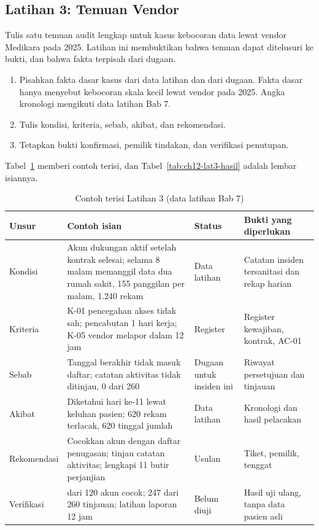 \subsection*{Latihan 3: Temuan Vendor}

Tulis satu temuan audit lengkap untuk kasus kebocoran data lewat vendor Medikara pada 2025. Latihan
ini membuktikan bahwa temuan dapat ditelusuri ke bukti, dan bahwa fakta terpisah dari dugaan.
\begin{enumerate}
  \item Pisahkan fakta dasar kasus dari data latihan dan dari dugaan. Fakta dasar hanya menyebut
  kebocoran skala kecil lewat vendor pada 2025. Angka kronologi mengikuti data latihan Bab 7.
  \item Tulis kondisi, kriteria, sebab, akibat, dan rekomendasi.
  \item Tetapkan bukti konfirmasi, pemilik tindakan, dan verifikasi penutupan.
\end{enumerate}

Tabel~\ref{tab:ch12-lat3-contoh} memberi contoh terisi, dan Tabel~\ref{tab:ch12-lat3-hasil} adalah
lembar isiannya.

\begin{table}[!htb]
  \centering\small
  \caption{Contoh terisi Latihan 3 (data latihan Bab 7)}\label{tab:ch12-lat3-contoh}
  \begin{tabularx}{\textwidth}{|>{\raggedright\arraybackslash}p{}|>{\raggedright\arraybackslash}X|>{\raggedright\arraybackslash}p{}|>{\raggedright\arraybackslash}p{}|}
    \hline
    \textbf{Unsur} & \textbf{Contoh isian} & \textbf{Status} & \textbf{Bukti yang diperlukan} \\
    \hline
    Kondisi & Akun dukungan aktif setelah kontrak selesai; selama 8 malam memanggil data dua rumah
    sakit, 155 panggilan per malam, 1.240 rekam & Data latihan & Catatan insiden tersanitasi dan
    rekap harian \\ \hline
    Kriteria & K-01 pencegahan akses tidak sah; pencabutan 1 hari kerja; K-05 vendor melapor dalam
    12 jam & Register & Register kewajiban, kontrak, AC-01 \\ \hline
    Sebab & Tanggal berakhir tidak masuk daftar; catatan aktivitas tidak ditinjau, 0 dari 260 &
    Dugaan untuk insiden ini & Riwayat persetujuan dan tinjauan \\ \hline
    Akibat & Diketahui hari ke-11 lewat keluhan pasien; 620 rekam terlacak, 620 tinggal jumlah &
    Data latihan & Kronologi dan hasil pelacakan \\ \hline
    Rekomendasi & Cocokkan akun dengan daftar penugasan; tinjau catatan aktivitas; lengkapi 11 butir
    perjanjian & Usulan & Tiket, pemilik, tenggat \\ \hline
    Verifikasi & 120 dari 120 akun cocok; 247 dari 260 tinjauan; latihan laporan 12 jam & Belum
    diuji & Hasil uji ulang, tanpa data pasien asli \\ \hline
  \end{tabularx}
\end{table}

